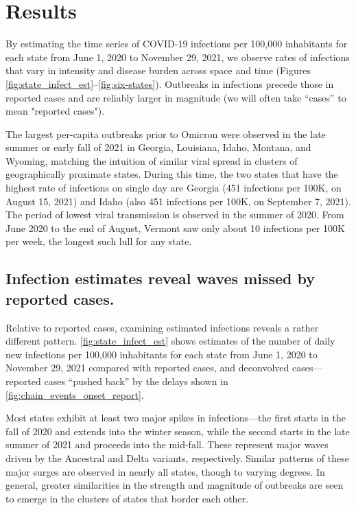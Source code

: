 \section{Results}
\label{sec:results}

By estimating the time series of COVID-19 infections per 100,000 inhabitants
for each \US state from June 1, 2020 to November 29, 2021, we observe rates of
infections that vary in intensity and disease burden across space and time
(Figures \ref{fig:state_infect_est}--\ref{fig:six-states}). Outbreaks in
infections precede those in reported cases and are reliably larger in magnitude
(we will often take ``cases'' to mean "reported cases").

The largest per-capita outbreaks prior to Omicron were observed in the late
summer or early fall of 2021 in Georgia, Louisiana, Idaho, Montana, and Wyoming,
matching the intuition of similar viral spread in clusters of geographically
proximate states. During this time, the two states that have the highest rate of
infections on single day are Georgia (451 infections per 100K, on August 15,
2021) and Idaho (also 451 infections per 100K, on September 7, 2021). The period
of lowest viral transmission is observed in the summer of 2020. From June 2020
to the end of August, Vermont saw only about 10 infections per 100K per week,
the longest such lull for any state.



\subsection{Infection estimates reveal waves missed by reported cases.}
\label{sec:omitted-waves}

Relative to reported cases, examining estimated infections reveals a
rather different pattern. \autoref{fig:state_infect_est} shows
estimates of the number of daily new infections per 100,000 inhabitants for each
\US state from June 1, 2020 to November 29, 2021 compared with reported cases,
and deconvolved cases---reported cases ``pushed back'' by the delays shown in
\autoref{fig:chain_events_onset_report}. 

Most states exhibit at least two major spikes in infections---the first starts
in the fall of 2020 and extends into the winter season, while the second starts
in the late summer of 2021 and proceeds into the mid-fall. These represent major
waves driven by the Ancestral and Delta variants, respectively. Similar patterns
of these major surges are observed in nearly all states, though to varying
degrees. In general, greater similarities in the strength and magnitude of
outbreaks are seen to emerge in the clusters of states that border each other.

